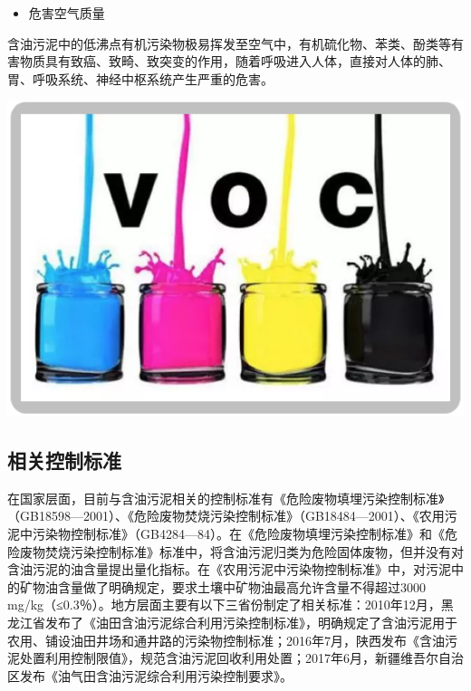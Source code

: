 \documentclass[
]{book}
\providecommand{\tightlist}{%
  \setlength{\itemsep}{0pt}\setlength{\parskip}{0pt}}
\begin{document}
\begin{itemize}
\tightlist
\item
  危害空气质量
\end{itemize}

含油污泥中的低沸点有机污染物极易挥发至空气中，有机硫化物、苯类、酚类等有害物质具有致癌、致畸、致突变的作用，随着呼吸进入人体，直接对人体的肺、胃、呼吸系统、神经中枢系统产生严重的危害。

\includegraphics[width=8.33in]{images/youni7}

\hypertarget{ux76f8ux5173ux63a7ux5236ux6807ux51c6}{%
\subsection{相关控制标准}\label{ux76f8ux5173ux63a7ux5236ux6807ux51c6}}

在国家层面，目前与含油污泥相关的控制标准有《危险废物填埋污染控制标准》（GB18598---2001）、《危险废物焚烧污染控制标准》（GB18484---2001）、《农用污泥中污染物控制标准》（GB4284---84）。在《危险废物填埋污染控制标准》和《危险废物焚烧污染控制标准》标准中，将含油污泥归类为危险固体废物，但并没有对含油污泥的油含量提出量化指标。在《农用污泥中污染物控制标准》中，对污泥中的矿物油含量做了明确规定，要求土壤中矿物油最高允许含量不得超过3000 mg/kg（≤0.3％）。地方层面主要有以下三省份制定了相关标准：2010年12月，黑龙江省发布了《油田含油污泥综合利用污染控制标准》，明确规定了含油污泥用于农用、铺设油田井场和通井路的污染物控制标准；2016年7月，陕西发布《含油污泥处置利用控制限值》，规范含油污泥回收利用处置；2017年6月，新疆维吾尔自治区发布《油气田含油污泥综合利用污染控制要求》。
\end{document}
